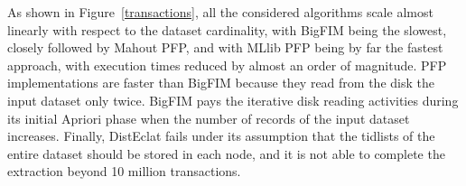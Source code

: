 \documentclass[preprint,review,12pt]{elsarticle}
\begin{document}
As shown in Figure~\ref{transactions}, all the considered algorithms scale
almost linearly with respect to the dataset cardinality, with BigFIM being the slowest,
closely followed by Mahout PFP,
and with MLlib PFP being by far the fastest approach,
with execution times reduced by almost an order of magnitude. 
PFP implementations are faster than BigFIM because they read from the disk the input dataset only twice. 
BigFIM pays the iterative disk reading activities during its initial Apriori phase when the number of records
of the input dataset increases.
Finally, DistEclat fails under its assumption that the tidlists of the entire dataset should
be stored in each node, and it is not able to complete the extraction beyond
10 million transactions.
%
\end{document}
